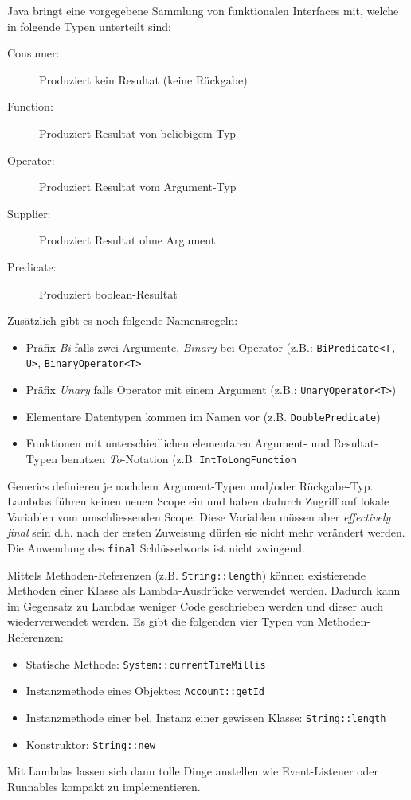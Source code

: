 Java bringt eine vorgegebene Sammlung von funktionalen Interfaces mit, welche in folgende Typen unterteilt sind:
\begin{description}
	\item[Consumer:] Produziert kein Resultat (keine Rückgabe)
	\item[Function:] Produziert Resultat von beliebigem Typ
	\item[Operator:] Produziert Resultat vom Argument-Typ
	\item[Supplier:] Produziert Resultat ohne Argument
	\item[Predicate:] Produziert boolean-Resultat
\end{description}
Zusätzlich gibt es noch folgende Namensregeln:
\begin{itemize}
	\item Präfix \textit{Bi} falls zwei Argumente, \textit{Binary} bei Operator (z.B.: \verb|BiPredicate<T, U>|, \verb|BinaryOperator<T>|
	\item Präfix \textit{Unary} falls Operator mit einem Argument (z.B.: \verb|UnaryOperator<T>|)
	\item Elementare Datentypen kommen im Namen vor (z.B. \verb|DoublePredicate|)
	\item Funktionen mit unterschiedlichen elementaren Argument- und Resultat-Typen benutzen \textit{To}-Notation (z.B. \verb|IntToLongFunction|
\end{itemize}
Generics definieren je nachdem Argument-Typen und/oder Rückgabe-Typ. Lambdas führen keinen neuen Scope ein und haben dadurch Zugriff auf lokale Variablen vom umschliessenden Scope. Diese Variablen müssen aber \textit{effectively final} sein d.h. nach der ersten Zuweisung dürfen sie nicht mehr verändert werden. Die Anwendung des \verb|final| Schlüsselworts ist nicht zwingend. 

Mittels Methoden-Referenzen (z.B. \verb|String::length|) können existierende Methoden einer Klasse als Lambda-Ausdrücke verwendet werden. Dadurch kann im Gegensatz zu Lambdas weniger Code geschrieben werden und dieser auch wiederverwendet werden. Es gibt die folgenden vier Typen von Methoden-Referenzen:
\begin{itemize}
	\item Statische Methode: \verb|System::currentTimeMillis|
	\item Instanzmethode eines Objektes: \verb|Account::getId|
	\item Instanzmethode einer bel. Instanz einer gewissen Klasse: \verb|String::length|
	\item Konstruktor: \verb|String::new|
\end{itemize}
Mit Lambdas lassen sich dann tolle Dinge anstellen wie Event-Listener oder Runnables kompakt zu implementieren. \\

